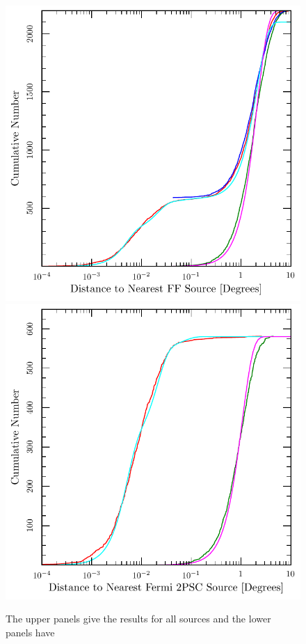 \documentclass[useAMS,usenatbib]{mn2e}
\begin{document}
\begin{figure}
\includegraphics[width=\columnwidth]{cumfermi_hib.pdf}
\includegraphics[width=\columnwidth]{cumff_hib.pdf}
\caption{The upper panels give the results for all sources and the lower panels have
}
\end{figure}
\end{document}
